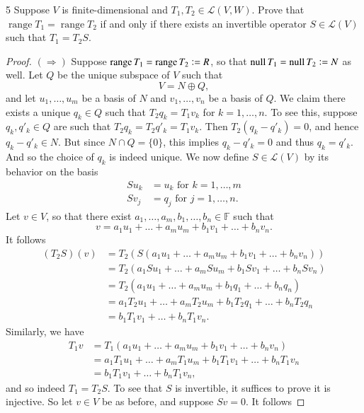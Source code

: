 \documentclass[11pt]{extarticle}
\newenvironment{problem}[1]{\begin{prob*}{#1}{}}{\end{prob*}}
\newcommand{\F}{\mathbb{F}}
\newcommand{\Hom}{\mathcal{L}}
\DeclareMathOperator{\Null}{null}
\DeclareMathOperator{\Range}{range}
\newcommand{\defeq}{\vcentcolon=}
\begin{document}
\begin{problem}{5}
Suppose $V$ is finite-dimensional and $T_1,T_2\in\Hom(V,W)$.  Prove that $\Range T_1 = \Range T_2$ if and only if there exists an invertible operator $S\in\Hom(V)$ such that $T_1=T_2S$.  
\end{problem}
\begin{proof}
$(\Rightarrow)$ Suppose $\Range T_1=\Range T_2 \defeq R$, so that $\Null T_1 = \Null T_2\defeq N$ as well.  Let $Q$ be the unique subspace of $V$ such that
\begin{equation*}
V = N \oplus Q,
\end{equation*}
and let $u_1,\dots,u_m$ be a basis of $N$ and $v_1,\dots,v_n$ be a basis of $Q$.  We claim there exists a unique $q_k\in Q$ such that $T_2q_k = T_1v_k$ for $k = 1,\dots, n$.  To see this, suppose $q_k,q'_k\in Q$ are such that $T_2q_k = T_2q'_k = T_1v_k$.  Then $T_2(q_k - q'_k) = 0$, and hence $q_k - q'_k \in N$.  But since $N\cap Q = \{0\}$, this implies $q_k - q'_k = 0$ and thus $q_k = q'_k$.  And so the choice of $q_k$ is indeed unique.  We now define $S\in\Hom(V)$ by its behavior on the basis
\begin{align*}
Su_k &= u_k \text{ for } k = 1,\dots,m\\
Sv_j &= q_j \text{ for }j = 1,\dots,n.
\end{align*}
Let $v\in V$, so that there exist $a_1,\dots, a_m,b_1,\dots,b_n\in\F$ such that 
\begin{equation*}
v = a_1u_1 + \dots + a_mu_m + b_1v_1 + \dots + b_nv_n.
\end{equation*}
It follows
\begin{align*}
(T_2S)(v) &= T_2(S(a_1u_1 + \dots + a_mu_m + b_1v_1 + \dots + b_nv_n))\\
&= T_2(a_1Su_1 + \dots + a_mSu_m + b_1Sv_1 + \dots + b_nSv_n)\\
&= T_2(a_1u_1 + \dots + a_mu_m + b_1q_1 + \dots + b_nq_n)\\
&= a_1T_2u_1 + \dots + a_mT_2u_m + b_1T_2q_1 + \dots + b_nT_2q_n\\
&= b_1T_1v_1 + \dots + b_nT_1v_n.
\end{align*}
Similarly, we have
\begin{align*}
T_1v &= T_1(a_1u_1 + \dots + a_mu_m + b_1v_1 + \dots + b_nv_n)\\
&= a_1T_1u_1 + \dots + a_mT_1u_m + b_1T_1v_1 + \dots + b_nT_1v_n\\
&= b_1T_1v_1 + \dots + b_nT_1v_n,
\end{align*}
and so indeed $T_1 = T_2S$.  To see that $S$ is invertible, it suffices to prove it is injective.  So let $v\in V$ be as before, and suppose $Sv = 0$.  It follows

\end{proof}
\end{document}
